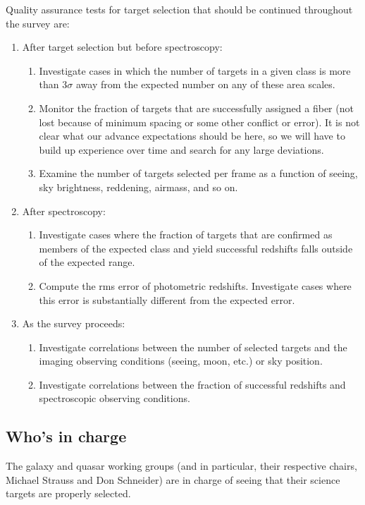 Quality assurance tests for target selection that should be
continued throughout the survey are:

\begin{enumerate}
\item After target selection but before spectroscopy:
\begin{enumerate}
\item Investigate cases in which the number of targets in a given class
is more than $3\sigma$ away from the expected number on any of these
area scales.
\item Monitor the fraction of targets that are successfully assigned a fiber
(not lost because of minimum spacing or some other conflict or error).
It is not clear what our advance expectations should be here, so we
will have to build up experience over time and search for any
large deviations.
\item Examine the number of targets selected per frame as a function
of seeing, sky brightness, reddening, airmass, and so on. 
\end{enumerate}
\item After spectroscopy:
\begin{enumerate}
\item Investigate cases where the fraction of targets that are confirmed
as members of the expected class and yield successful redshifts falls
outside of the expected range.
\item Compute the rms error of photometric redshifts.  Investigate
cases where this error is substantially different from the expected error.
\end{enumerate}
\item As the survey proceeds:
\begin{enumerate}
\item Investigate correlations between the number of selected targets and
the imaging observing conditions (seeing, moon, etc.) or sky position.
\item Investigate correlations between the fraction of successful
redshifts and spectroscopic observing conditions.
\end{enumerate}
\end{enumerate}

\subsection{Who's in charge}
The galaxy and quasar working groups (and in particular, their
respective chairs, Michael Strauss and Don Schneider) are in charge
of seeing that their science targets are properly selected.

